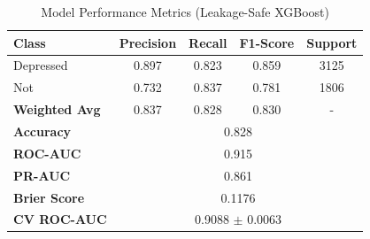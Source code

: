 \begin{table}[h]
\centering
\caption{Model Performance Metrics (Leakage-Safe XGBoost)}
\label{tab:performance_metrics}
\begin{tabular}{lcccc}
\hline
Class & Precision & Recall & F1-Score & Support \\
\hline
Depressed & 0.897 & 0.823 & 0.859 & 3125 \\
Not & 0.732 & 0.837 & 0.781 & 1806 \\
\hline
\textbf{Weighted Avg} & 0.837 & 0.828 & 0.830 & - \\
\hline
\textbf{Accuracy} & \multicolumn{4}{c}{0.828} \\
\textbf{ROC-AUC} & \multicolumn{4}{c}{0.915} \\
\textbf{PR-AUC} & \multicolumn{4}{c}{0.861} \\
\textbf{Brier Score} & \multicolumn{4}{c}{0.1176} \\
\textbf{CV ROC-AUC} & \multicolumn{4}{c}{0.9088 $\pm$ 0.0063} \\
\hline
\end{tabular}
\end{table}